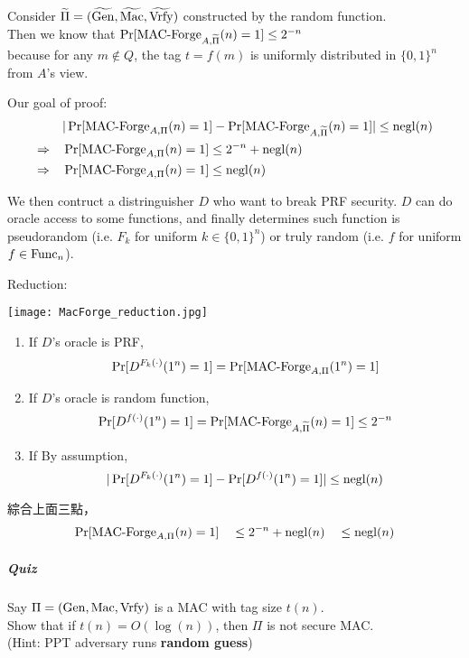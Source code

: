 \begin{myProof}
	Consider \(\widetilde{\Pi} = (\widetilde{\operatorname{Gen}}, \widetilde{\operatorname{\mathrm{Mac}}}, \widetilde{\operatorname{\mathrm{Vrfy}}})\) constructed by the random function. \\
	Then we know that \(\Pr[\operatorname{\mathrm{MAC-Forge}}_{A, \widetilde{\Pi}}(n) = 1] \leq 2^{-n}\) \\
	because for any \(m \not\in Q\), the tag \(t = f(m)\) is uniformly distributed in \(\{0, 1\}^n\) from \(A\)'s view.
	
	Our goal of proof:
	\begin{align*}
		&| \Pr[\operatorname{\mathrm{MAC-Forge}}_{A, \Pi}(n) = 1] - \Pr[\operatorname{\mathrm{MAC-Forge}}_{A, \widetilde{\Pi}}(n) = 1] | \leq \operatorname{negl}(n) \\
		\Rightarrow \quad &\Pr[\operatorname{\mathrm{MAC-Forge}}_{A, \Pi}(n) = 1] \leq 2^{-n} + \operatorname{negl}(n) \\
		\Rightarrow \quad &\Pr[\operatorname{\mathrm{MAC-Forge}}_{A, \Pi}(n) = 1] \leq \operatorname{negl}(n)
	\end{align*}
	
	We then contruct a distringuisher \(D\) who want to break PRF security. \(D\) can do oracle access to some functions, and finally determines such function is pseudorandom (i.e. \(F_k\) for uniform \(k \in \{0, 1\}^n\)) or truly random (i.e. \(f\) for uniform \(f \in \operatorname{\mathrm{Func}}_n\)).
	
	Reduction:
	\begin{center}
		\texttt{[image: MacForge\_reduction.jpg]}
	\end{center}
	
	\begin{enumerate}[label=(\roman*)]
		\item If \(D\)'s oracle is PRF,
			\[\Pr[D^{F_k(\cdot)}(1^n) = 1] = \Pr[\operatorname{\mathrm{MAC-Forge}}_{A, \Pi}(1^n) = 1]\]
		\item If \(D\)'s oracle is random function,
			\[\Pr[D^{f(\cdot)}(1^n) = 1] = \Pr[\operatorname{\mathrm{MAC-Forge}}_{A, \widetilde{\Pi}}(n) = 1] \leq 2^{-n}\]
		\item If By assumption,
			\[ |\Pr[D^{F_k(\cdot)}(1^n) = 1] - \Pr[D^{f(\cdot)}(1^n) = 1]| \leq \operatorname{negl}(n)\]
	\end{enumerate}
	綜合上面三點，
	\[ \Pr[\operatorname{\mathrm{MAC-Forge}}_{A, \Pi}(n) = 1] \quad \leq 2^{-n} + \operatorname{negl}(n) \quad \leq \operatorname{negl}(n) \]
	
\end{myProof}

\subparagraph{Quiz}

Say \(\Pi = (\operatorname{Gen}, \operatorname{\mathrm{Mac}}, \operatorname{\mathrm{Vrfy}})\) is a MAC with tag size \(t(n)\). \\
Show that if \(t(n) = O(\log(n))\), then \(\Pi\) is not secure MAC. \\
(Hint: PPT adversary runs \textbf{random guess})


